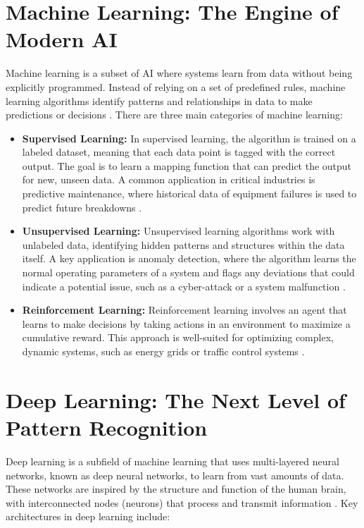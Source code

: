\section{Machine Learning: The Engine of Modern AI}
\label{sec:machine_learning}
Machine learning is a subset of AI where systems learn from data without being explicitly programmed. Instead of relying on a set of predefined rules, machine learning algorithms identify patterns and relationships in data to make predictions or decisions \parencite{Samuel1959}. There are three main categories of machine learning:

\begin{itemize}
    \item \textbf{Supervised Learning:} In supervised learning, the algorithm is trained on a labeled dataset, meaning that each data point is tagged with the correct output. The goal is to learn a mapping function that can predict the output for new, unseen data. A common application in critical industries is predictive maintenance, where historical data of equipment failures is used to predict future breakdowns \parencite{Sarker2021}.
    \item \textbf{Unsupervised Learning:} Unsupervised learning algorithms work with unlabeled data, identifying hidden patterns and structures within the data itself. A key application is anomaly detection, where the algorithm learns the normal operating parameters of a system and flags any deviations that could indicate a potential issue, such as a cyber-attack or a system malfunction \parencite{Chandola2009}.
    \item \textbf{Reinforcement Learning:} Reinforcement learning involves an agent that learns to make decisions by taking actions in an environment to maximize a cumulative reward. This approach is well-suited for optimizing complex, dynamic systems, such as energy grids or traffic control systems \parencite{SuttonBarto2018}.
\end{itemize}

\section{Deep Learning: The Next Level of Pattern Recognition}
\label{sec:deep_learning}
Deep learning is a subfield of machine learning that uses multi-layered neural networks, known as deep neural networks, to learn from vast amounts of data. These networks are inspired by the structure and function of the human brain, with interconnected nodes (neurons) that process and transmit information \parencite{LeCun2015}. Key architectures in deep learning include:

